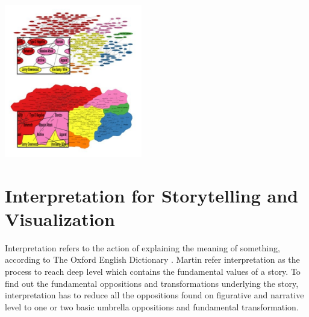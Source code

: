 \documentclass{egpubl}
\begin{document}
\begingroup
\centering
\includegraphics[width=6cm]{./images/saket2015}
\label{fig:saket2015}
\endgroup
\section{Interpretation for Storytelling and Visualization}
Interpretation refers to the action of explaining the meaning of something, according to The Oxford English Dictionary \cite{Interpretation}. Martin\cite{Martin1997} refer interpretation as the process to reach deep level which contains the fundamental values of a story.  To find out the fundamental oppositions and transformations underlying the story, interpretation has to reduce all the oppositions found on figurative and narrative level to one or two basic umbrella oppositions and fundamental transformation.
\end{document}
